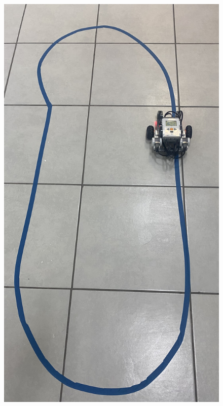 \documentclass[oneside,onecolumn]{article}
\begin{document}
\begin{figure}[!hb]
  \centering
  \includegraphics[angle=90,scale=0.2]{graficos/path_robot.png}
\end{figure}
\end{document}
